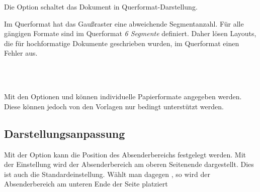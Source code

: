 \begin{Declaration}
\end{Declaration}

\begin{minipage}{0.45\textwidth}
Die Option  schaltet das Dokument in Querformat-Darstellung.

  Im Querformat hat das Gaußraster eine abweichende
  Segmentanzahl. Für alle gängigen Formate sind im Querformat \emph{6 Segmente}
  definiert. Daher lösen Layouts, die für hochformatige Dokumente
  geschrieben wurden, im Querformat einen Fehler aus. %
\end{minipage}\hfill
\begin{minipage}{0.5\textwidth}\centering
{}
\end{minipage}

\begin{Declaration}
  \\
  \\
\end{Declaration}

Mit den Optionen  und  können individuelle
Papierformate angegeben werden.
Diese können jedoch von den Vorlagen nur bedingt unterstützt werden.

\subsection{Darstellungsanpassung}

\vspace*{-6mm}
\begin{Declaration}
\end{Declaration}

Mit der Option  kann die Position des Absenderbereichs
festgelegt werden. Mit der Einstellung  wird
der Absenderbereich am oberen Seitenende dargestellt. Dies ist auch die
Standardeinstellung. Wählt man dagegen , so
wird der Absenderbereich am unteren Ende der Seite platziert

